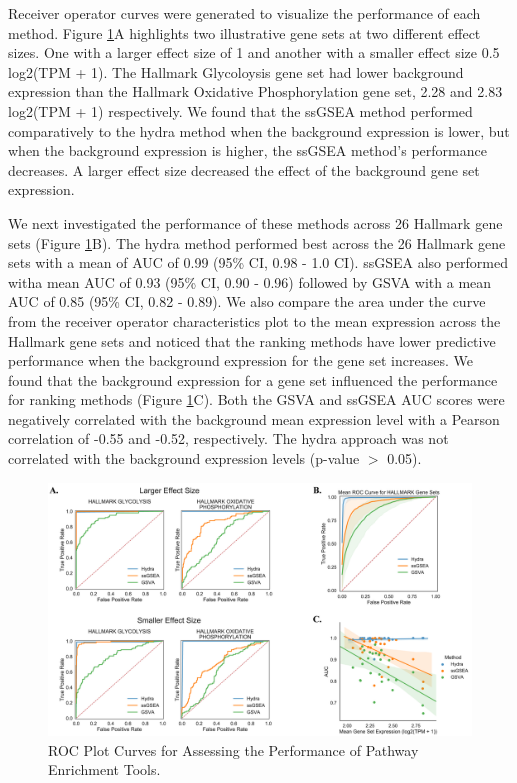 \documentclass[fleqn,10pt]{wlscirep}
\begin{document}
Receiver operator curves were generated to visualize the performance of each method. Figure \ref{sfig:rocplot}A highlights two illustrative gene sets at two different effect sizes. One with a larger effect size of 1 and another with a smaller effect size 0.5 log2(TPM + 1). The Hallmark Glycoloysis gene set had lower background expression than the Hallmark Oxidative Phosphorylation gene set, 2.28 and 2.83 log2(TPM + 1) respectively. We found that the ssGSEA method performed comparatively to the hydra method when the background expression is lower, but when the background expression is higher, the ssGSEA method's performance decreases. A larger effect size decreased the effect of the background gene set expression.

We next investigated the performance of these methods across 26 Hallmark gene sets (Figure \ref{sfig:rocplot}B). The hydra method performed best across the 26 Hallmark gene sets with a mean of AUC of 0.99 (95\% CI, 0.98 - 1.0 CI). ssGSEA also performed witha mean AUC of 0.93 (95\% CI, 0.90 - 0.96) followed by GSVA with a mean AUC of 0.85 (95\% CI, 0.82 - 0.89).  We also compare the area under the curve from the receiver operator characteristics plot to the mean expression across the Hallmark gene sets and noticed that the ranking methods have lower predictive performance when the background expression for the gene set increases. We found that the background expression for a gene set influenced the performance for ranking methods (Figure \ref{sfig:rocplot}C). Both the GSVA and ssGSEA AUC scores were negatively correlated with the background mean expression level with a Pearson correlation of -0.55 and -0.52, respectively. The hydra approach was not correlated with the background expression levels (p-value $>$ 0.05).


\begin{figure}
	\centering
	\includegraphics[width=0.8\linewidth]{images/figure-2-roc-curves@2x.png}
	\caption{ROC Plot Curves for Assessing the Performance of Pathway Enrichment Tools.}
	\label{sfig:rocplot}
\end{figure}
\end{document}
